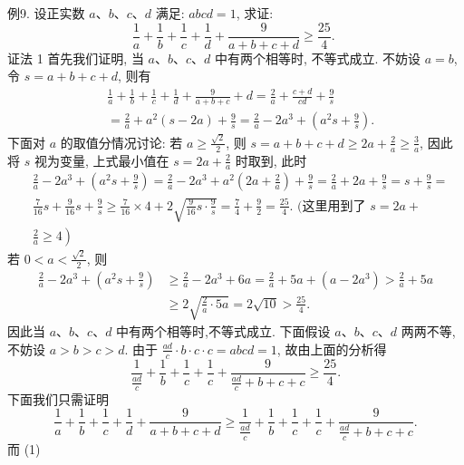 例9. 设正实数 $a 、 b 、 c 、 d$ 满足: $a b c d=1$, 求证:
$$
\frac{1}{a}+\frac{1}{b}+\frac{1}{c}+\frac{1}{d}+\frac{9}{a+b+c+d} \geqslant \frac{25}{4} \text {. }
$$
证法 1 首先我们证明, 当 $a 、 b 、 c 、 d$ 中有两个相等时, 不等式成立.
不妨设 $a=b$, 令 $s=a+b+c+d$, 则有
$$
\begin{aligned}
& \frac{1}{a}+\frac{1}{b}+\frac{1}{c}+\frac{1}{d}+\frac{9}{a+b+c}+d=\frac{2}{a}+\frac{c+d}{c d}+\frac{9}{s} \\
& =\frac{2}{a}+a^2(s-2 a)+\frac{9}{s}=\frac{2}{a}-2 a^3+\left(a^2 s+\frac{9}{s}\right) .
\end{aligned}
$$
下面对 $a$ 的取值分情况讨论:
若 $a \geqslant \frac{\sqrt{2}}{2}$, 则 $s=a+b+c+d \geqslant 2 a+\frac{2}{a} \geqslant \frac{3}{a}$, 因此将 $s$ 视为变量, 上式最小值在 $s=2 a+\frac{2}{a}$ 时取到, 此时
$$
\begin{aligned}
& \frac{2}{a}-2 a^3+\left(a^2 s+\frac{9}{s}\right)=\frac{2}{a}-2 a^3+a^2\left(2 a+\frac{2}{a}\right)+\frac{9}{s}=\frac{2}{a}+2 a+\frac{9}{s}=s+\frac{9}{s}= \\
& \frac{7}{16} s+\frac{9}{16} s+\frac{9}{s} \geqslant \frac{7}{16} \times 4+2 \sqrt{\frac{9}{16} s \cdot \frac{9}{s}}=\frac{7}{4}+\frac{9}{2}=\frac{25}{4} \text {. (这里用到了 } s=2 a+ \\
& \left.\frac{2}{a} \geqslant 4\right)
\end{aligned}
$$
若 $0<a<\frac{\sqrt{2}}{2}$, 则
$$
\begin{aligned}
\frac{2}{a}-2 a^3+\left(a^2 s+\frac{9}{s}\right) & \geqslant \frac{2}{a}-2 a^3+6 a=\frac{2}{a}+5 a+\left(a-2 a^3\right)>\frac{2}{a}+5 a \\
& \geqslant 2 \sqrt{\frac{2}{a} \cdot 5 a}=2 \sqrt{10}>\frac{25}{4} .
\end{aligned}
$$
因此当 $a 、 b 、 c 、 d$ 中有两个相等时,不等式成立.
下面假设 $a 、 b 、 c 、 d$ 两两不等, 不妨设 $a>b>c>d$. 由于 $\frac{a d}{c} \cdot b \cdot c \cdot c= a b c d=1$, 故由上面的分析得
$$
\frac{1}{\frac{a d}{c}}+\frac{1}{b}+\frac{1}{c}+\frac{1}{c}+\frac{9}{\frac{a d}{c}+b+c+c} \geqslant \frac{25}{4} .
$$
下面我们只需证明
$$
\frac{1}{a}+\frac{1}{b}+\frac{1}{c}+\frac{1}{d}+\frac{9}{a+b+c+d} \geqslant \frac{1}{\frac{a d}{c}}+\frac{1}{b}+\frac{1}{c}+\frac{1}{c}+\frac{9}{\frac{a d}{c}+b+c+c} . \label{(1)}
$$
而 (1)
